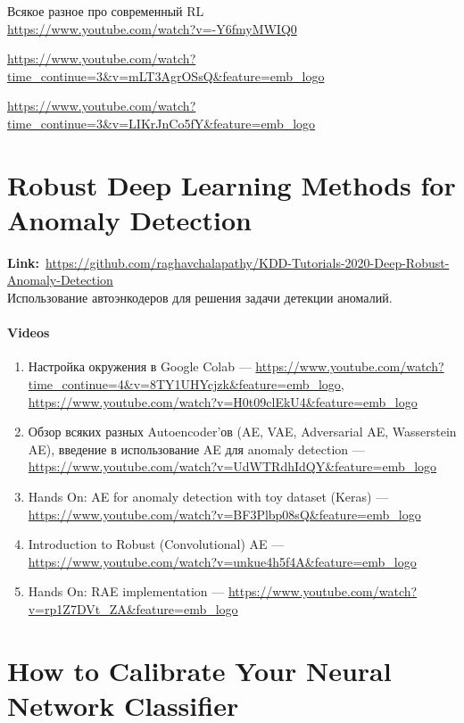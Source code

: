 Всякое разное про современный RL \\

\url{https://www.youtube.com/watch?v=-Y6fmyMWIQ0}

\url{https://www.youtube.com/watch?time_continue=3&v=mLT3AgrOSsQ&feature=emb_logo}

\url{https://www.youtube.com/watch?time_continue=3&v=LIKrJnCo5fY&feature=emb_logo}


\section*{Robust Deep Learning Methods for Anomaly Detection} 

\textbf{Link:}~\url{https://github.com/raghavchalapathy/KDD-Tutorials-2020-Deep-Robust-Anomaly-Detection} \\

Использование автоэнкодеров для решения задачи детекции аномалий. 

\paragraph{Videos}

\begin{enumerate}
    \item Настройка окружения в Google Colab --- \url{https://www.youtube.com/watch?time_continue=4&v=8TY1UHYcjzk&feature=emb_logo}, \url{https://www.youtube.com/watch?v=H0t09clEkU4&feature=emb_logo}
    \item Обзор всяких разных Autoencoder'ов (AE, VAE, Adversarial AE, Wasserstein AE), введение в использование AE для anomaly detection --- \url{https://www.youtube.com/watch?v=UdWTRdhIdQY&feature=emb_logo}
    \item Hands On: AE for anomaly detection with toy dataset (Keras) --- \url{https://www.youtube.com/watch?v=BF3Plbp08sQ&feature=emb_logo}
    \item Introduction to Robust (Convolutional) AE --- \url{https://www.youtube.com/watch?v=unkue4h5f4A&feature=emb_logo}
    \item Hands On: RAE implementation --- \url{https://www.youtube.com/watch?v=rp1Z7DVt_ZA&feature=emb_logo}
\end{enumerate}


\section*{How to Calibrate Your Neural Network Classifier}

